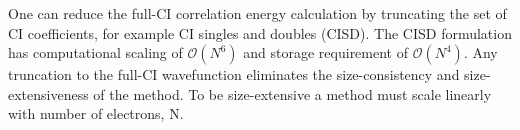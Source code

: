       One can reduce the full-CI correlation energy calculation by truncating the set of CI coefficients, for example CI singles and doubles (CISD). 
      The CISD formulation has computational scaling of $\mathcal{O}(N^6)$ and storage requirement of $\mathcal{O}(N^4)$. Any truncation to the full-CI wavefunction eliminates the size-consistency and size-extensiveness of the method. To be size-extensive a method must scale linearly with number of electrons, N.%

